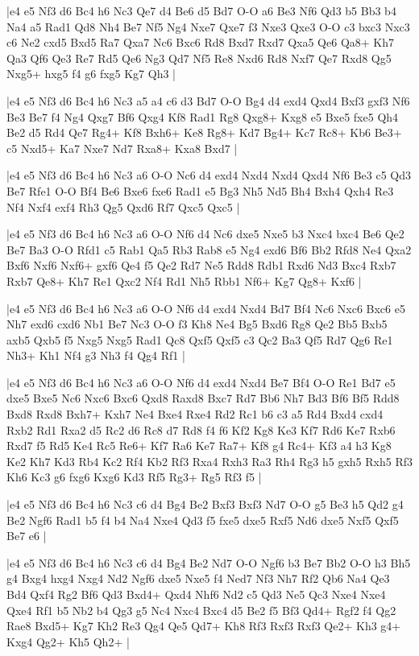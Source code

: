 \whitename{}
\blackname{}
\makegametitle
|e4 e5 Nf3 d6 Bc4 h6 Nc3 Qe7 d4 Be6 d5 Bd7 O-O a6 Be3 Nf6 Qd3 b5 Bb3 b4 Na4 a5 Rad1 Qd8 Nh4 Be7 Nf5 Ng4 Nxe7 Qxe7 f3 Nxe3 Qxe3 O-O c3 bxc3 Nxc3 c6 Ne2 cxd5 Bxd5 Ra7 Qxa7 Nc6 Bxc6 Rd8 Bxd7 Rxd7 Qxa5 Qe6 Qa8+ Kh7 Qa3 Qf6 Qe3 Re7 Rd5 Qe6 Ng3 Qd7 Nf5 Re8 Nxd6 Rd8 Nxf7 Qe7 Rxd8 Qg5 Nxg5+ hxg5 f4 g6 fxg5 Kg7 Qh3  |

\whitename{}
\blackname{}
\makegametitle
|e4 e5 Nf3 d6 Bc4 h6 Nc3 a5 a4 c6 d3 Bd7 O-O Bg4 d4 exd4 Qxd4 Bxf3 gxf3 Nf6 Be3 Be7 f4 Ng4 Qxg7 Bf6 Qxg4 Kf8 Rad1 Rg8 Qxg8+ Kxg8 e5 Bxe5 fxe5 Qh4 Be2 d5 Rd4 Qe7 Rg4+ Kf8 Bxh6+ Ke8 Rg8+ Kd7 Bg4+ Kc7 Rc8+ Kb6 Be3+ c5 Nxd5+ Ka7 Nxe7 Nd7 Rxa8+ Kxa8 Bxd7  |

\whitename{}
\blackname{}
\makegametitle
|e4 e5 Nf3 d6 Bc4 h6 Nc3 a6 O-O Nc6 d4 exd4 Nxd4 Nxd4 Qxd4 Nf6 Be3 c5 Qd3 Be7 Rfe1 O-O Bf4 Be6 Bxe6 fxe6 Rad1 e5 Bg3 Nh5 Nd5 Bh4 Bxh4 Qxh4 Re3 Nf4 Nxf4 exf4 Rh3 Qg5 Qxd6 Rf7 Qxc5 Qxc5  |

\whitename{}
\blackname{}
\makegametitle
|e4 e5 Nf3 d6 Bc4 h6 Nc3 a6 O-O Nf6 d4 Nc6 dxe5 Nxe5 b3 Nxc4 bxc4 Be6 Qe2 Be7 Ba3 O-O Rfd1 c5 Rab1 Qa5 Rb3 Rab8 e5 Ng4 exd6 Bf6 Bb2 Rfd8 Ne4 Qxa2 Bxf6 Nxf6 Nxf6+ gxf6 Qe4 f5 Qe2 Rd7 Ne5 Rdd8 Rdb1 Rxd6 Nd3 Bxc4 Rxb7 Rxb7 Qe8+ Kh7 Re1 Qxc2 Nf4 Rd1 Nh5 Rbb1 Nf6+ Kg7 Qg8+ Kxf6  |

\whitename{}
\blackname{}
\makegametitle
|e4 e5 Nf3 d6 Bc4 h6 Nc3 a6 O-O Nf6 d4 exd4 Nxd4 Bd7 Bf4 Nc6 Nxc6 Bxc6 e5 Nh7 exd6 cxd6 Nb1 Be7 Nc3 O-O f3 Kh8 Ne4 Bg5 Bxd6 Rg8 Qe2 Bb5 Bxb5 axb5 Qxb5 f5 Nxg5 Nxg5 Rad1 Qc8 Qxf5 Qxf5 c3 Qc2 Ba3 Qf5 Rd7 Qg6 Re1 Nh3+ Kh1 Nf4 g3 Nh3 f4 Qg4 Rf1  |

\whitename{}
\blackname{}
\makegametitle
|e4 e5 Nf3 d6 Bc4 h6 Nc3 a6 O-O Nf6 d4 exd4 Nxd4 Be7 Bf4 O-O Re1 Bd7 e5 dxe5 Bxe5 Nc6 Nxc6 Bxc6 Qxd8 Raxd8 Bxc7 Rd7 Bb6 Nh7 Bd3 Bf6 Bf5 Rdd8 Bxd8 Rxd8 Bxh7+ Kxh7 Ne4 Bxe4 Rxe4 Rd2 Rc1 b6 c3 a5 Rd4 Bxd4 cxd4 Rxb2 Rd1 Rxa2 d5 Rc2 d6 Rc8 d7 Rd8 f4 f6 Kf2 Kg8 Ke3 Kf7 Rd6 Ke7 Rxb6 Rxd7 f5 Rd5 Ke4 Rc5 Re6+ Kf7 Ra6 Ke7 Ra7+ Kf8 g4 Rc4+ Kf3 a4 h3 Kg8 Ke2 Kh7 Kd3 Rb4 Kc2 Rf4 Kb2 Rf3 Rxa4 Rxh3 Ra3 Rh4 Rg3 h5 gxh5 Rxh5 Rf3 Kh6 Kc3 g6 fxg6 Kxg6 Kd3 Rf5 Rg3+ Rg5 Rf3 f5  |

\whitename{}
\blackname{}
\makegametitle
|e4 e5 Nf3 d6 Bc4 h6 Nc3 c6 d4 Bg4 Be2 Bxf3 Bxf3 Nd7 O-O g5 Be3 h5 Qd2 g4 Be2 Ngf6 Rad1 b5 f4 b4 Na4 Nxe4 Qd3 f5 fxe5 dxe5 Rxf5 Nd6 dxe5 Nxf5 Qxf5 Be7 e6  |

\whitename{}
\blackname{}
\makegametitle
|e4 e5 Nf3 d6 Bc4 h6 Nc3 c6 d4 Bg4 Be2 Nd7 O-O Ngf6 b3 Be7 Bb2 O-O h3 Bh5 g4 Bxg4 hxg4 Nxg4 Nd2 Ngf6 dxe5 Nxe5 f4 Ned7 Nf3 Nh7 Rf2 Qb6 Na4 Qe3 Bd4 Qxf4 Rg2 Bf6 Qd3 Bxd4+ Qxd4 Nhf6 Nd2 c5 Qd3 Ne5 Qc3 Nxe4 Nxe4 Qxe4 Rf1 b5 Nb2 b4 Qg3 g5 Nc4 Nxc4 Bxc4 d5 Be2 f5 Bf3 Qd4+ Rgf2 f4 Qg2 Rae8 Bxd5+ Kg7 Kh2 Re3 Qg4 Qe5 Qd7+ Kh8 Rf3 Rxf3 Rxf3 Qe2+ Kh3 g4+ Kxg4 Qg2+ Kh5 Qh2+  |

